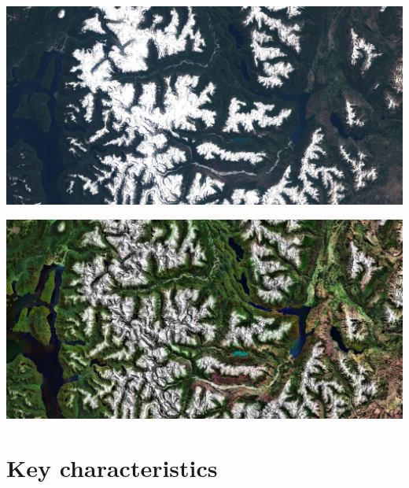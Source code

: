 \documentclass[8pt]{beamer}
\begin{document}
\vspace*{-6.5mm}
\begin{frame}[plain]
\hspace*{-11mm}
    \includegraphics[keepaspectratio,height=1.1\paperheight]{images/imag4tci.jpg}
\end{frame}

\vspace*{-6.5mm}
\begin{frame}[plain]
\hspace*{-11mm}
\includegraphics[keepaspectratio,height=1.1\paperheight]{images/image4_glob_each_lim20_8b_sub.jpg}
\end{frame}


\section{Key characteristics}
\end{document}
